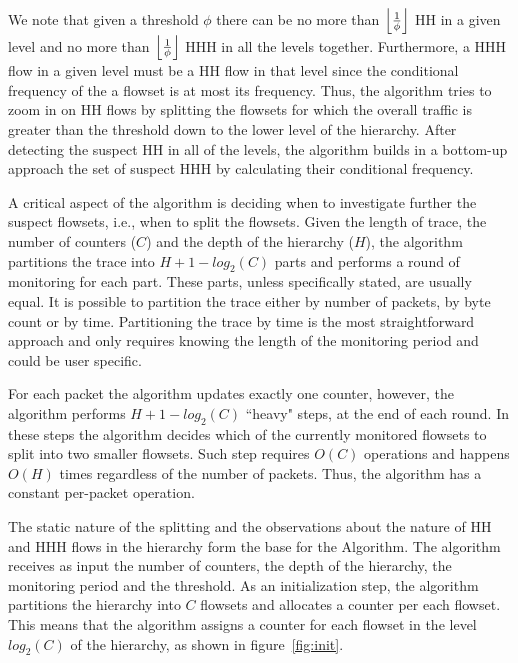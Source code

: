We note that given a threshold $\phi$ there can be no more than $\left\lfloor \frac{1}{\phi} \right\rfloor$ HH in a given level and no more than $\left\lfloor \frac{1}{\phi} \right\rfloor$ HHH in all the levels together.
Furthermore, a HHH flow in a given level must be a HH flow in that level since the conditional frequency of the a flowset is at most its frequency.
Thus, the algorithm tries to zoom in on HH flows by splitting the flowsets for which the overall traffic is greater than the threshold down to the lower level of the hierarchy. After detecting the suspect HH in all of the levels, the algorithm builds in a bottom-up approach the set of suspect HHH by calculating their conditional frequency.

A critical aspect of the algorithm is deciding when to investigate further the suspect flowsets, i.e., when to split the flowsets. Given the length of trace, the number of counters ($C$) and the depth of the hierarchy ($H$), the algorithm partitions the trace into $H+1-log_2(C)$ parts and performs a round of monitoring for each part. These parts, unless specifically stated, are usually equal. It is possible to partition the trace either by number of packets, by byte count or by time. Partitioning the trace by time is the most straightforward approach and only requires knowing the length of the monitoring period and could be user specific.

For each packet the algorithm updates exactly one counter, however, the algorithm performs $H+1-log_2(C)$ ``heavy" steps, at the end of each round. In these steps the algorithm decides which of the currently monitored flowsets to split into two smaller flowsets. Such step requires $O(C)$ operations and happens $O(H)$ times regardless of the number of packets. Thus, the algorithm has a constant per-packet operation.

The static nature of the splitting and the observations about the nature of HH and HHH flows in the hierarchy form the base for the \simpleAlgo Algorithm. The algorithm receives as input the number of counters, the depth of the hierarchy, the monitoring period and the threshold. As an initialization step, the algorithm partitions the hierarchy into $C$ flowsets and allocates a counter per each flowset. This means that the algorithm assigns a counter for each flowset in the level $log_2(C)$ of the hierarchy, as shown in figure~\ref{fig:init}.

